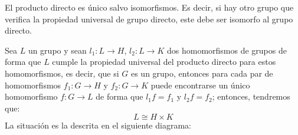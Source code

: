 El producto directo es único salvo isomorfismos. Es decir, si hay otro grupo que verifica la propiedad universal de grupo directo, este debe ser isomorfo al grupo directo.
\begin{teo}
    Sea $L$ un grupo y sean $l_1:L\to H$, $l_2:L\to K$ dos homomorfismos de grupos de forma que $L$ cumple la propiedad universal del producto directo para estos homomorfismos, es decir, que si $G$ es un grupo, entonces para cada par de homomorfismos $f_1:G\to H$ y $f_2:G\to K$ puede encontrarse un único homomorfismo $f:G\to L$ de forma que $l_1f = f_1$ y $l_2f = f_2$; entonces, tendremos que:
    \begin{equation*}
        L\cong H\times K
    \end{equation*}
    La situación es la descrita en el siguiente diagrama:
   \begin{figure}[H]
       \centering
   \end{figure}


\end{teo}
